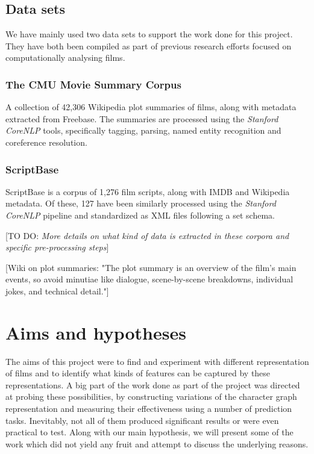 \documentclass[bsc,frontabs,singlespacing,parskip, twoside]{infthesis}
\begin{document}
\section{Data sets} \label{sec:data sets}
We have mainly used two data sets to support the work done for this project. They have both been compiled as part of previous research efforts focused on computationally analysing films.

\subsection{The CMU Movie Summary Corpus}
A collection of 42,306 Wikipedia plot summaries of films, along with metadata extracted from Freebase. The summaries are processed using the \textit{Stanford CoreNLP} tools, specifically tagging, parsing, named entity recognition and coreference resolution.

\subsection{ScriptBase}
ScriptBase \cite{Gorinski2015} is a corpus of 1,276 film scripts, along with IMDB and Wikipedia metadata. Of these, 127 have been similarly processed using the \textit{Stanford CoreNLP} pipeline and standardized as XML files following a set schema.

[TO DO: \textit{More details on what kind of data is extracted in these corpora and specific pre-processing steps}]

[Wiki on plot summaries: "The plot summary is an overview of the film's main events, so avoid minutiae like dialogue, scene-by-scene breakdowns, individual jokes, and technical detail."]

\chapter{Aims and hypotheses}
\label{chap:aims}

The aims of this project were to find and experiment with different representation of films and to identify what kinds of features can be captured by these representations. A big part of the work done as part of the project was directed at probing these possibilities, by constructing variations of the character graph representation and measuring their effectiveness using a number of prediction tasks. Inevitably, not all of them produced significant results or were even practical to test. Along with our main hypothesis, we will present some of the work which did not yield any fruit and attempt to discuss the underlying reasons.
\end{document}
